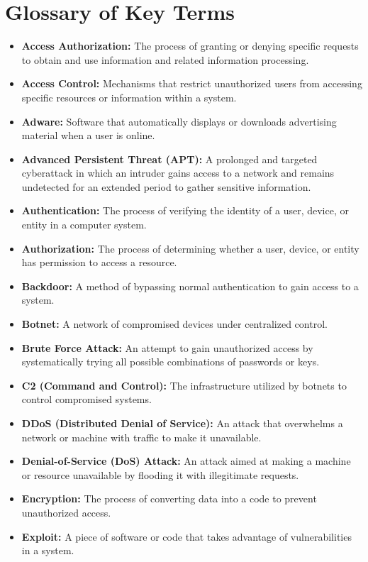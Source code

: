 \documentclass{article}
\begin{document}
\section*{Glossary of Key Terms}
\begin{itemize}
    \item \textbf{Access Authorization:} The process of granting or denying specific requests to obtain and use information and related information processing.
    \item \textbf{Access Control:} Mechanisms that restrict unauthorized users from accessing specific resources or information within a system.
    \item \textbf{Adware:} Software that automatically displays or downloads advertising material when a user is online.
    \item \textbf{Advanced Persistent Threat (APT):} A prolonged and targeted cyberattack in which an intruder gains access to a network and remains undetected for an extended period to gather sensitive information.
    \item \textbf{Authentication:} The process of verifying the identity of a user, device, or entity in a computer system.
    \item \textbf{Authorization:} The process of determining whether a user, device, or entity has permission to access a resource.
    \item \textbf{Backdoor:} A method of bypassing normal authentication to gain access to a system.
    \item \textbf{Botnet:} A network of compromised devices under centralized control.
    \item \textbf{Brute Force Attack:} An attempt to gain unauthorized access by systematically trying all possible combinations of passwords or keys.
    \item \textbf{C2 (Command and Control):} The infrastructure utilized by botnets to control compromised systems.
    \item \textbf{DDoS (Distributed Denial of Service):} An attack that overwhelms a network or machine with traffic to make it unavailable.
    \item \textbf{Denial-of-Service (DoS) Attack:} An attack aimed at making a machine or resource unavailable by flooding it with illegitimate requests.
    \item \textbf{Encryption:} The process of converting data into a code to prevent unauthorized access.
    \item \textbf{Exploit:} A piece of software or code that takes advantage of vulnerabilities in a system.

\end{itemize}
\end{document}
